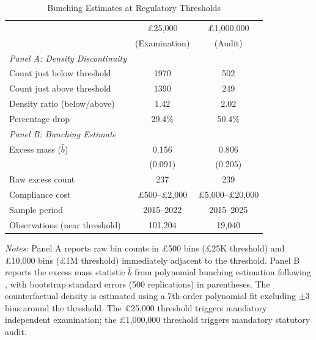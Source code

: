 \begin{table}[htbp]
\centering
\caption{Bunching Estimates at Regulatory Thresholds}
\label{tab:bunching}
\begin{tabular}{lcc}
\hline\hline
& \pounds25,000 & \pounds1,000,000 \\
& (Examination) & (Audit) \\
\hline
\addlinespace
\emph{Panel A: Density Discontinuity} & & \\
Count just below threshold & 1970 & 502 \\
Count just above threshold & 1390 & 249 \\
Density ratio (below/above) & 1.42 & 2.02 \\
Percentage drop & 29.4\% & 50.4\% \\
\addlinespace
\emph{Panel B: Bunching Estimate} & & \\
Excess mass ($\hat{b}$) & 0.156 & 0.806 \\
& (0.091) & (0.205) \\
Raw excess count & 237 & 239 \\
\addlinespace
Compliance cost & \pounds500--\pounds2,000 & \pounds5,000--\pounds20,000 \\
Sample period & 2015--2022 & 2015--2025 \\
Observations (near threshold) & 101,204 & 19,040 \\
\hline\hline
\end{tabular}
\begin{tablenotes}[flushleft]
\small
\item \textit{Notes:} Panel A reports raw bin counts in \pounds500 bins (\pounds25K threshold) and \pounds10,000 bins (\pounds1M threshold) immediately adjacent to the threshold. Panel B reports the excess mass statistic $\hat{b}$ from polynomial bunching estimation following \citet{klevenWaseem2013}, with bootstrap standard errors (500 replications) in parentheses. The counterfactual density is estimated using a 7th-order polynomial fit excluding $\pm$3 bins around the threshold. The \pounds25,000 threshold triggers mandatory independent examination; the \pounds1,000,000 threshold triggers mandatory statutory audit.
\end{tablenotes}
\end{table}
